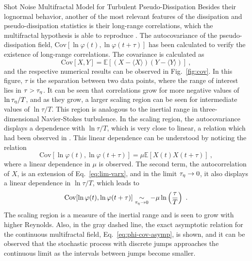 \begin{chapter}{Shot Noise Multifractal Model for Turbulent Pseudo-Dissipation}
Besides their lognormal behavior, another of the most relevant features of the dissipation and pseudo-dissipation statistics is their long-range correlations, which the multifractal hypothesis is able to reproduce \parencite{gurvichyaglom1967,meneveausreenivasan1991,sreenivasanantonia1997}. The autocovariance of the pseudo-dissipation field, $\mathrm{Cov}[\ln \varphi(t),\ln \varphi(t+\tau)]$ has been calculated to verify the existence of long-range correlations. The covariance is calculated as
\begin{equation} \label{eq:gen-cov}
    \mathrm{Cov}[X,Y] =
    \mathbb{E}[(X-\langle X \rangle)(Y-\langle Y \rangle)] \ ,
\end{equation}
and the respective numerical results can be observed in Fig.~\ref{fig:cov}. In this figure, $\tau$ is the separation between two data points, where the range of interest lies in $\tau > \tau_{\eta}$. It can be seen that correlations grow for more negative values of $\ln\tau_{\eta}/T$, and as they grow, a larger scaling region can be seen for intermediate values of $\ln\tau/T$. This region is analogous to the inertial range in three-dimensional Navier-Stokes turbulence. In the scaling region, the autocovariance displays a dependence with $\ln\tau/T$, which is very close to linear, a relation which had been observed in \textcite{pereira2018multifractal}. This linear dependence can be understood by noticing the relation
\begin{equation}
    \mathrm{Cov}[\ln \varphi(t),\ln \varphi(t+\tau)]
    = \mu \mathbb{E}[X(t) X(t+\tau)] \ ,
\end{equation}
where a linear dependence in $\mu$ is observed. The second term, the autocorrelation of $X$, is an extension of Eq.~\eqref{eq:lim-varx}, and in the limit $\tau_{\eta} \to 0$, it also displays a linear dependence in $\ln\tau/T$, which leads to
\begin{equation} \label{eq:phi-cov-asymp}
    \mathrm{Cov}[\ln \varphi(t),\ln \varphi(t+\tau)] \underset{\tau_{\eta} \to 0}{\sim} - \mu \ln \left( \frac{\tau}{T} \right) \ .
\end{equation}
The scaling region is a measure of the inertial range and is seen to grow with higher Reynolds. Also, in the gray dashed line, the exact asymptotic relation for the continuous multifractal field, Eq.~\eqref{eq:phi-cov-asymp}, is shown, and it can be observed that the stochastic process with discrete jumps approaches the continuous limit as the intervals between jumps become smaller.


\end{chapter}
